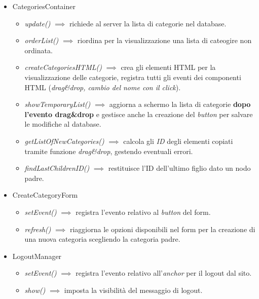 \begin{itemize}
\tightlist
\item
  CategoriesContainer

  \begin{itemize}
  \tightlist
  \item
    \emph{update()} \(\implies\) richiede al server la lista di
    categorie nel database.
  \item
    \emph{orderList()} \(\implies\) riordina per la visualizzazione una
    lista di cateogire non ordinata.
  \item
    \emph{createCategoriesHTML()} \(\implies\) crea gli elementi HTML
    per la visualizzazione delle categorie, registra tutti gli eventi
    dei componenti HTML (\emph{drag\&drop, cambio del nome con il
    click}).
  \item
    \emph{showTemporaryList()} \(\implies\) aggiorna a schermo la lista
    di categorie \textbf{dopo l'evento drag\&drop} e gestisce anche la
    creazione del \emph{button} per salvare le modifiche al database.
  \item
    \emph{getListOfNewCategories()} \(\implies\) calcola gli \emph{ID}
    degli elementi copiati tramite funzione \emph{drag\&drop}, gestendo
    eventuali errori.
  \item
    \emph{findLastChildrenID()} \(\implies\) restituisce l'ID
    dell'ultimo figlio dato un nodo padre.
  \end{itemize}
\item
  CreateCategoryForm

  \begin{itemize}
  \tightlist
  \item
    \emph{setEvent()} \(\implies\) registra l'evento relativo al
    \emph{button} del form.
  \item
    \emph{refresh()} \(\implies\) riaggiorna le opzioni disponibili nel
    form per la creazione di una nuova categoria scegliendo la categoria
    padre.
  \end{itemize}
\item
  LogoutManager

  \begin{itemize}
  \tightlist
  \item
    \emph{setEvent()} \(\implies\) registra l'evento relativo
    all'\emph{anchor} per il logout dal sito.
  \item
    \emph{show()} \(\implies\) imposta la visibilità del messaggio di
    logout.
  \end{itemize}
\end{itemize}


